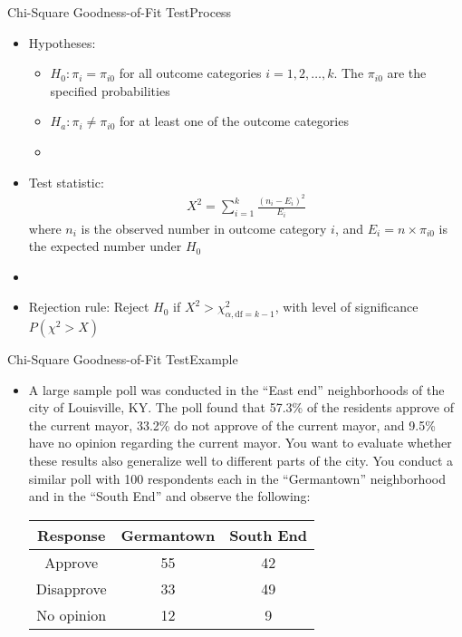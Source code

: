 \documentclass[xcolor=dvipsnames]{beamer}
\begin{document}
\begin{frame}{Chi-Square Goodness-of-Fit Test}{Process}
	\begin{itemize}
		\item Hypotheses:
		\begin{itemize}
			\item $H_0: \pi_i = \pi_{i0}$ for all outcome categories $i = 1, 2, \hdots, k$. The $\pi_{i0}$ are the specified probabilities
			\item $H_a: \pi_i \neq \pi_{i0}$ for at least one of the outcome categories
			\item[]
		\end{itemize}
	\item Test statistic: 
	\begin{gather*}
		X^2 = \sum_{i=1}^k \frac{(n_i-E_i)^2}{E_i}
	\end{gather*}
	where $n_i$ is the observed number in outcome category $i$, and $E_i=n \times \pi_{i0}$ is the expected number under $H_0$
	\item[]
	\item Rejection rule: Reject $H_0$ if $X^2 > \chi_{\alpha,\text{df}=k-1}^2$, with level of significance $P(\chi^2 > X)$
	\end{itemize}
\end{frame}

\begin{frame}{Chi-Square Goodness-of-Fit Test}{Example}
	\begin{itemize}
		\item A large sample poll was conducted in the ``East end'' neighborhoods of the city of Louisville, KY. The poll found that 57.3\% of the residents approve of the current mayor, 33.2\% do not approve of the current mayor, and 9.5\% have no opinion regarding the current mayor. You want to evaluate whether these results also generalize well to different parts of the city. You conduct a similar poll with 100 respondents each in the ``Germantown'' neighborhood and in the ``South End'' and observe the following:
		\vspace{2mm}
		\begin{center}
			\begin{tabular}{ccc}
				\hline
				Response & Germantown & South End \\ \hline \hline
				Approve & 55 & 42\\
				Disapprove & 33 & 49 \\
				No opinion & 12 & 9 \\ \hline
			\end{tabular}
		\end{center}
	\end{itemize}
\end{frame}
\end{document}
